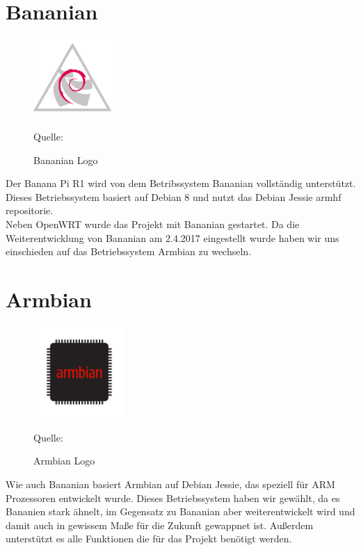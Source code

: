 \section{Bananian}
\begin{figure}
\centering
\includegraphics[width=3cm]{pictures/Jakob/Bananian}
\caption{Bananian Logo}
Quelle: \cite{bananian1}
\end{figure}
Der Banana Pi R1 wird von dem Betribssystem Bananian vollständig unterstützt. Dieses Betriebssystem basiert auf Debian 8 und nutzt das Debian Jessie armhf repositorie. \cite{bananian}\\
Neben OpenWRT wurde das Projekt mit Bananian gestartet. Da die Weiterentwicklung von Bananian am 2.4.2017 eingestellt wurde haben wir uns einschieden auf das Betriebssystem Armbian zu wechseln. \cite{bananian2}

\section{Armbian}
\begin{figure}
\centering
\includegraphics[width=3.5cm]{pictures/Jakob/Armbian}
\caption{Armbian Logo}
Quelle: \cite{armbian}
\end{figure}
Wie auch Bananian basiert Armbian auf Debian Jessie, das speziell für ARM Prozessoren entwickelt wurde. Dieses Betriebssystem haben wir gewählt, da es Bananien stark ähnelt, im Gegensatz zu Bananian aber weiterentwickelt wird und damit auch in gewissem Maße für die Zukunft gewappnet ist. Außerdem unterstützt es alle Funktionen die für das Projekt benötigt werden. \cite{armbian1}







